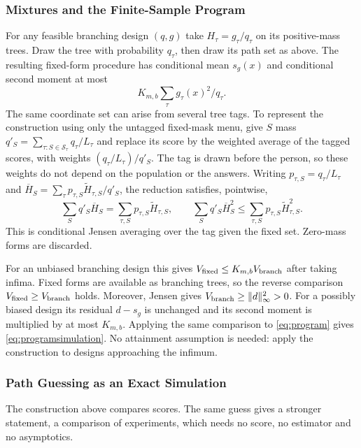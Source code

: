 \subsubsection{Mixtures and the Finite-Sample Program}
For any feasible branching design $(q,g)$ take $H_\tau=g_\tau/q_\tau$ on its positive-mass trees. Draw the tree with probability $q_\tau$, then draw its path set as above. The resulting fixed-form procedure has conditional mean $s_g(x)$ and conditional second moment at most
\[
 K_{m,b}\sum_\tau g_\tau(x)^2/q_\tau.
\]
The same coordinate set can arise from several tree tags. To represent the construction using only the untagged fixed-mask menu, give $S$ mass $q'_S=\sum_{\tau:S\in\mathcal S_\tau}q_\tau/L_\tau$ and replace its score by the weighted average of the tagged scores, with weights $(q_\tau/L_\tau)/q'_S$. The tag is drawn before the person, so these weights do not depend on the population or the answers. Writing $p_{\tau,S}=q_\tau/L_\tau$ and $\overline H_S=\sum_\tau p_{\tau,S}\widetilde H_{\tau,S}/q'_S$, the reduction satisfies, pointwise,
\[
 \sum_Sq'_S\overline H_S=\sum_{\tau,S}p_{\tau,S}\widetilde H_{\tau,S},
 \qquad
 \sum_Sq'_S\overline H_S^2\le\sum_{\tau,S}p_{\tau,S}\widetilde H_{\tau,S}^2.
\]
This is conditional Jensen averaging over the tag given the fixed set. Zero-mass forms are discarded.

For an unbiased branching design this gives $V_{\rm fixed}\le K_{m,b}V_{\rm branch}$ after taking infima. Fixed forms are available as branching trees, so the reverse comparison $V_{\rm fixed}\ge V_{\rm branch}$ holds. Moreover, Jensen gives $V_{\rm branch}\ge\|d\|_\infty^2>0$. For a possibly biased design its residual $d-s_g$ is unchanged and its second moment is multiplied by at most $K_{m,b}$. Applying the same comparison to \eqref{eq:program} gives \eqref{eq:programsimulation}. No attainment assumption is needed: apply the construction to designs approaching the infimum.

\subsubsection{Path Guessing as an Exact Simulation}\label{app:simulation}
The construction above compares scores. The same guess gives a stronger
statement, a comparison of experiments, which needs no score, no estimator
and no asymptotics.

